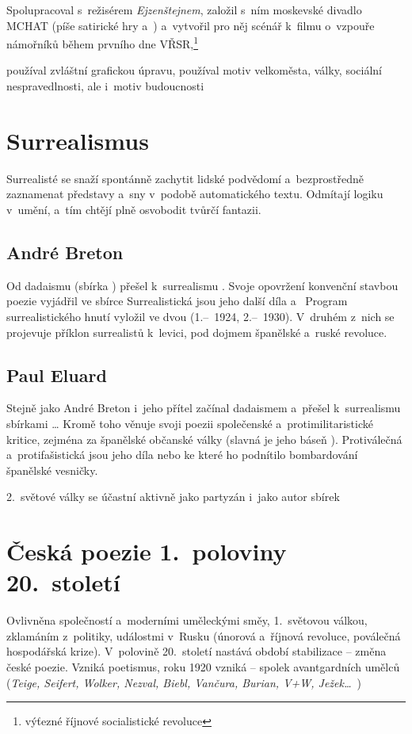 Spolupracoval s~režisérem \emph{Ejzenštejnem}, založil s~ním moskevské
divadlo MCHAT (píše satirické hry  a~)
a~vytvořil pro něj scénář k~filmu o~vzpouře námořníků během prvního dne
VŘSR,\footnote{výťezné říjnové socialistické revoluce} 

 používal zvláštní grafickou úpravu,
používal motiv velkoměsta, války, sociální nespravedlnosti, ale
i~motiv budoucnosti

\section{Surrealismus}
Surrealisté se snaží spontánně zachytit lidské podvědomí a~bezprostředně
zaznamenat představy a~sny v~podobě automatického textu. Odmítají logiku
v~umění, a~tím chtějí plně osvobodit tvůrčí fantazii.

\subsection*{André Breton}
Od dadaismu (sbírka ) přešel k~surrealismu . Svoje opovržení konvenční stavbou poezie vyjádřil ve sbírce
 Surrealistická jsou jeho další díla  a~ Program surrealistického hnutí vyložil ve
dvou  (1.--~1924, 2.--~1930). V~druhém
z~nich se projevuje příklon surrealistů k~levici, pod dojmem španělské
a~ruské revoluce.

\subsection*{Paul Eluard}
Stejně jako André Breton i~jeho přítel  začínal
dadaismem a~přešel k~surrealismu sbírkami 
 \dots{} Kromě toho věnuje svoji poezii
společenské a~protimilitaristické kritice, zejména za španělské občanské
války (slavná je jeho báseň ). Protiválečná
a~protifašistická jsou jeho díla 
 nebo  ke které ho
podnítilo bombardování španělské vesničky.

2.~světové války se účastní aktivně jako partyzán i~jako autor sbírek

\section{Česká poezie 1.~poloviny 20.~století}
Ovlivněna společností a~moderními uměleckými směy, 1.~světovou válkou,
zklamáním z~politiky, událostmi v~Rusku (únorová a~říjnová revoluce,
poválečná hospodářská krize). V~polovině 20.~století nastává období
stabilizace -- změna české poezie. Vzniká poetismus, roku 1920 vzniká
 -- spolek avantgardních umělců (\emph{Teige, Seifert,
Wolker, Nezval, Biebl, Vančura, Burian, V+W, Ježek\dots{}}~)

